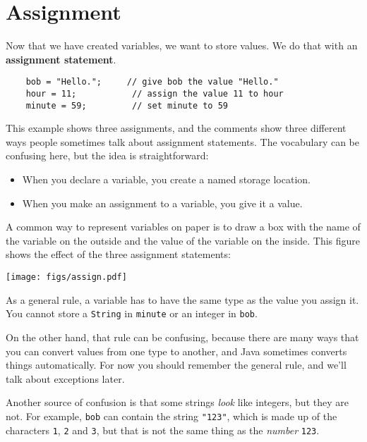 \documentclass[12pt]{book}
\theoremstyle{definition}
\begin{document}
\section{Assignment}

Now that we have created variables, we want to
store values.  We do that with an {\bf assignment
statement}.

\begin{lstlisting}
    bob = "Hello.";     // give bob the value "Hello."
    hour = 11;           // assign the value 11 to hour
    minute = 59;         // set minute to 59
\end{lstlisting}
%
This example shows three assignments, and the comments show
three different ways people sometimes talk about assignment
statements.  The vocabulary can be confusing here, but the
idea is straightforward:

\begin{itemize}

\item When you declare a variable, you create a named storage location.

\item When you make an assignment to a variable, you give it a value.

\end{itemize}

A common way to represent variables on paper is to draw a box
with the name of the variable on the outside and the value
of the variable on the inside.  This figure shows
the effect of the three assignment statements:


\texttt{[image: figs/assign.pdf]}


As a general rule,
a variable has to have the same type as the
value you assign it.  You cannot store a {\tt String} in {\tt minute} or an
integer in {\tt bob}.

On the other hand, that rule can be confusing, because there are many
ways that you can convert values from one type to another, and Java
sometimes converts things automatically.  For now you should
remember the general rule, and we'll talk about exceptions later.

Another source of confusion is that some strings {\em look}
like integers, but they are not.  For example, {\tt bob}
can contain the string {\tt "123"}, which is made up of the
characters {\tt 1}, {\tt 2} and {\tt 3}, but that is not
the same thing as the {\em number} {\tt 123}.
\end{document}
